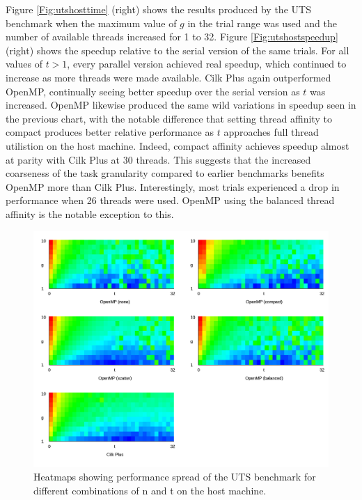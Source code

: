 \documentclass{report}
\begin{document}
Figure \ref{Fig:utshosttime} (right) shows the results produced by the UTS benchmark when the maximum value of \(g\) in the trial range was used and the number of available threads increased for 1 to 32. Figure \ref{Fig:utshostspeedup} (right) shows the speedup relative to the serial version of the same trials. For all values of \(t>1\), every parallel version achieved real speedup, which continued to increase as more threads were made available. Cilk Plus again outperformed OpenMP, continually seeing better speedup over the serial version as \(t\) was increased. OpenMP likewise produced the same wild variations in speedup seen in the previous chart, with the notable difference that setting thread affinity to compact produces better relative performance as \(t\) approaches full thread utilistion on the host machine. Indeed, compact affinity achieves speedup almost at parity with Cilk Plus at 30 threads. This suggests that the increased coarseness of the task granularity compared to earlier benchmarks benefits OpenMP more than Cilk Plus. Interestingly, most trials experienced a drop in performance when 26 threads were used. OpenMP using the balanced thread affinity is the notable exception to this.
\noindent
\begin{figure}[t!]
	\includegraphics[width=\linewidth]{../../heatmaps/intel64/uts}
	\caption{Heatmaps showing performance spread of the UTS benchmark for different combinations of n and t on the host machine.}
	\label{Fig:utshostheatmap}
\end{figure}
\end{document}
